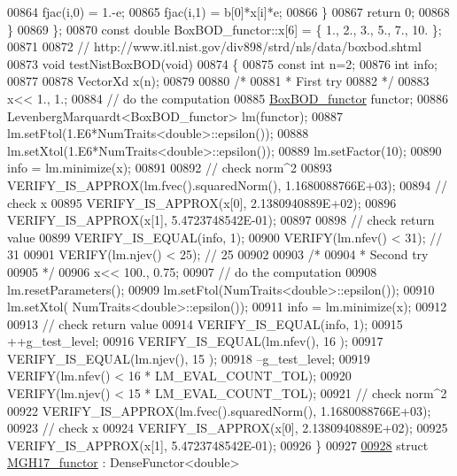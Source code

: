 \begin{DoxyCode}
00864             fjac(i,0) = 1.-e;
00865             fjac(i,1) = b[0]*x[i]*e;
00866         \}
00867         \textcolor{keywordflow}{return} 0;
00868     \}
00869 \};
00870 \textcolor{keyword}{const} \textcolor{keywordtype}{double} BoxBOD\_functor::x[6] = \{ 1., 2., 3., 5., 7., 10. \};
00871 
00872 \textcolor{comment}{// http://www.itl.nist.gov/div898/strd/nls/data/boxbod.shtml}
00873 \textcolor{keywordtype}{void} testNistBoxBOD(\textcolor{keywordtype}{void})
00874 \{
00875   \textcolor{keyword}{const} \textcolor{keywordtype}{int} n=2;
00876   \textcolor{keywordtype}{int} info;
00877 
00878   VectorXd x(n);
00879 
00880   \textcolor{comment}{/*}
00881 \textcolor{comment}{   * First try}
00882 \textcolor{comment}{   */}
00883   x<< 1., 1.;
00884   \textcolor{comment}{// do the computation}
00885   \hyperlink{struct_box_b_o_d__functor}{BoxBOD\_functor} functor;
00886   LevenbergMarquardt<BoxBOD\_functor> lm(functor);
00887   lm.setFtol(1.E6*NumTraits<double>::epsilon());
00888   lm.setXtol(1.E6*NumTraits<double>::epsilon());
00889   lm.setFactor(10);
00890   info = lm.minimize(x);
00891 
00892   \textcolor{comment}{// check norm^2}
00893   VERIFY\_IS\_APPROX(lm.fvec().squaredNorm(), 1.1680088766E+03);
00894   \textcolor{comment}{// check x}
00895   VERIFY\_IS\_APPROX(x[0], 2.1380940889E+02);
00896   VERIFY\_IS\_APPROX(x[1], 5.4723748542E-01);
00897   
00898   \textcolor{comment}{// check return value}
00899   VERIFY\_IS\_EQUAL(info, 1);
00900   VERIFY(lm.nfev() < 31); \textcolor{comment}{// 31}
00901   VERIFY(lm.njev() < 25); \textcolor{comment}{// 25}
00902 
00903   \textcolor{comment}{/*}
00904 \textcolor{comment}{   * Second try}
00905 \textcolor{comment}{   */}
00906   x<< 100., 0.75;
00907   \textcolor{comment}{// do the computation}
00908   lm.resetParameters();
00909   lm.setFtol(NumTraits<double>::epsilon());
00910   lm.setXtol( NumTraits<double>::epsilon());
00911   info = lm.minimize(x);
00912 
00913   \textcolor{comment}{// check return value}
00914   VERIFY\_IS\_EQUAL(info, 1); 
00915   ++g\_test\_level;
00916   VERIFY\_IS\_EQUAL(lm.nfev(), 16 );
00917   VERIFY\_IS\_EQUAL(lm.njev(), 15 );
00918   --g\_test\_level;
00919   VERIFY(lm.nfev() < 16 * LM\_EVAL\_COUNT\_TOL);
00920   VERIFY(lm.njev() < 15 * LM\_EVAL\_COUNT\_TOL);
00921   \textcolor{comment}{// check norm^2}
00922   VERIFY\_IS\_APPROX(lm.fvec().squaredNorm(), 1.1680088766E+03);
00923   \textcolor{comment}{// check x}
00924   VERIFY\_IS\_APPROX(x[0], 2.1380940889E+02);
00925   VERIFY\_IS\_APPROX(x[1], 5.4723748542E-01);
00926 \}
00927 
\hyperlink{struct_m_g_h17__functor}{00928} \textcolor{keyword}{struct }\hyperlink{struct_m_g_h17__functor}{MGH17\_functor} : DenseFunctor<double>

\end{DoxyCode}
